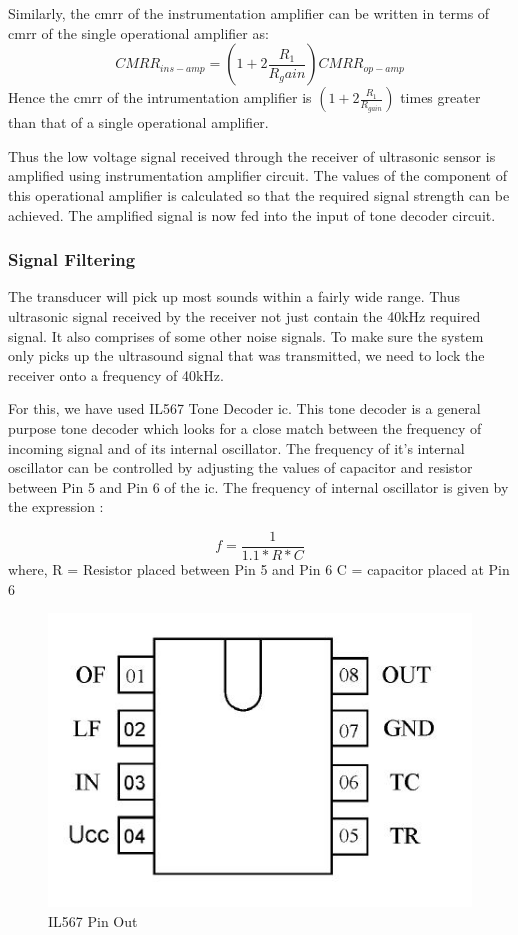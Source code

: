 Similarly, the \gls{cmrr} of the instrumentation amplifier can be written in terms of \gls{cmrr} of the single operational amplifier as:
\begin{equation}
	CMRR_{ins-amp}=(1+2\frac{R_1}{R_gain})CMRR_{op-amp} \nonumber
\end{equation}
Hence the \gls{cmrr} of the intrumentation amplifier is $(1+2\frac{R_1}{R_{gain}})$ times greater than that of a single operational amplifier.

	
Thus the low voltage signal received through the receiver of ultrasonic sensor is amplified using instrumentation amplifier circuit. The values of the component of this operational amplifier is calculated so that the required signal strength can be achieved. The amplified signal is now fed into the input of tone decoder circuit.


\subsubsection{Signal Filtering}

The transducer will pick up most sounds within a fairly wide range. Thus ultrasonic signal received by the receiver not just contain the 40kHz required signal. It also comprises of some other noise signals. To make sure the system only picks up the ultrasound signal that was transmitted, we need to lock the receiver onto a frequency of 40kHz. 

For this, we have used IL567 Tone Decoder \gls{ic}. This tone decoder is a general purpose tone decoder which looks for a close match between the frequency of incoming signal and of its internal oscillator. The frequency of it's internal oscillator can be controlled by adjusting the values of capacitor and resistor between Pin 5 and Pin 6 of the \gls{ic}. The frequency of internal oscillator is given by the expression :\cite{Yichao}

\begin{equation}
	f=\frac{1}{1.1*R*C}
\end{equation}
where,
R = Resistor placed between Pin 5 and Pin 6
C = capacitor placed at Pin 6
\begin{figure}[h]
	\centering
	\includegraphics[scale=0.5]{Images/IL567PinOut.jpg}
	\caption{IL567 Pin Out}
	\label{fig:PinOut}
\end{figure}

